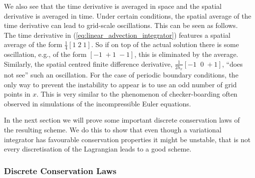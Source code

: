 \documentclass[12pt,a4paper,reqno]{article}
\begin{document}
We also see that the time derivative is averaged in space and the spatial derivative is averaged in time. Under certain conditions, the spatial average of the time derivative can lead to grid-scale oscillations.
This can be seen as follows. The time derivative in (\ref{eq:linear_advection_integrator}) features a spatial average of the form $\tfrac{1}{4} [ 1 \; 2 \; 1 ]$. So if on top of the actual solution there is some oscillation, e.g., of the form $[ -1 \; +1 \; -1 ]$, this is eliminated by the average.
Similarly, the spatial centred finite difference derivative, $\tfrac{1}{2 h_{x}} [-1 \;\; 0 \; +1 ]$, ``does not see'' such an oscillation. For the case of periodic boundary conditions, the only way to prevent the instability to appear is to use an odd number of grid points in $x$.
This is very similar to the phenomenon of checker-boarding often observed in simulations of the incompressible Euler equations.

In the next section we will prove some important discrete conservation laws of the resulting scheme.
We do this to show that even though a variational integrator has favourable conservation properties it might be unstable, that is not every discretisation of the Lagrangian leads to a good scheme.

\subsubsection*{Discrete Conservation Laws}
\end{document}
